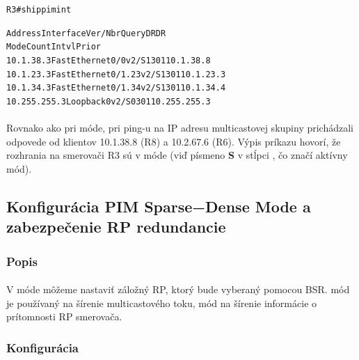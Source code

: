 \documentclass[12pt,twoside,a4paper]{report}
\begin{document}
\noindent
{\selectfont
\begin{small}
\begin{alltt}

R3#sh ip pim int

Address          Interface            Ver/   Nbr    Query  DR     DR
                                      Mode   Count  Intvl  Prior
10.1.38.3        FastEthernet0/0      v2/S   1      30     1      10.1.38.8
10.1.23.3        FastEthernet0/1.23   v2/S   1      30     1      10.1.23.3
10.1.34.3        FastEthernet0/1.34   v2/S   1      30     1      10.1.34.4
10.255.255.3     Loopback0            v2/S   0      30     1      10.255.255.3
\end{alltt}
\end{small}
}


\paragraph{}
Rovnako ako pri  móde, pri ping-u na IP adresu multicastovej skupiny prichádzali odpovede od klientov 10.1.38.8 (R8) a 10.2.67.6 (R6). Výpis príkazu  hovorí, že rozhrania na smerovači R3 sú v  móde (viď písmeno \textbf{S} v stĺpci , čo značí aktívny  mód).










\subsection{Konfigurácia PIM Sparse−Dense Mode a zabezpečenie RP redundancie}
\subsubsection{Popis}
\paragraph{}
V  móde môžeme nastaviť záložný RP, ktorý bude vyberaný pomocou BSR.  mód je používaný na šírenie multicastového toku,  mód na šírenie informácie o prítomnosti RP smerovača.

\subsubsection{Konfigurácia}
\end{document}
